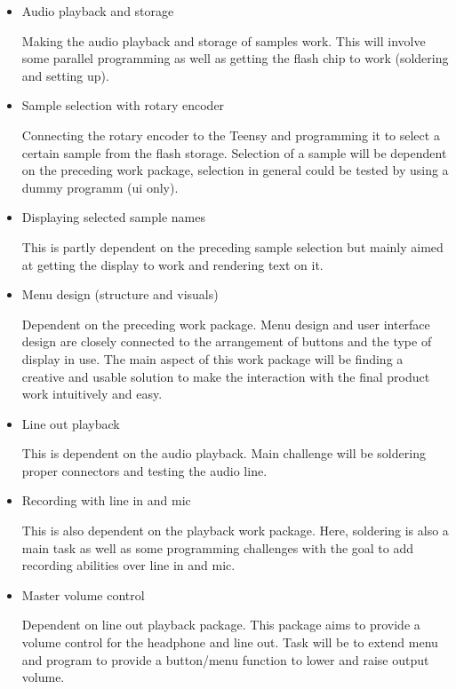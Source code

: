 \begin{itemize}
	\item Audio playback and storage

		Making the audio playback and storage of samples work.
		This will involve some parallel programming as well as
		getting the flash chip to work (soldering and setting up).

	\item Sample selection with rotary encoder

		Connecting the rotary encoder to the Teensy and programming it
		to select a certain sample from the flash storage. Selection of
		a sample will be dependent on the preceding work package, selection
		in general could be tested by using a dummy programm (ui only).

	\item Displaying selected sample names

		This is partly dependent on the preceding sample selection but mainly
		aimed at getting the display to work and rendering text on it.

	\item Menu design (structure and visuals)

		Dependent on the preceding work package. Menu design and user interface design
		are closely connected to the arrangement of buttons and the type of display 
		in use. The main aspect of this work package will be finding a creative and
		usable solution to make the interaction with the final product work intuitively
		and easy.

	\item Line out playback

		This is dependent on the audio playback. Main challenge will be soldering
		proper connectors and testing the audio line.

	\item Recording with line in and mic

		This is also dependent on the playback work package. Here, soldering is also
		a main task as well as some programming challenges with the goal to add
		recording abilities over line in and mic.

	\item Master volume control

		Dependent on line out playback package. This package aims to provide a
		volume control for the headphone and line out. Task will be to extend menu
		and program to provide a button/menu function to lower and raise output volume.


\end{itemize}
